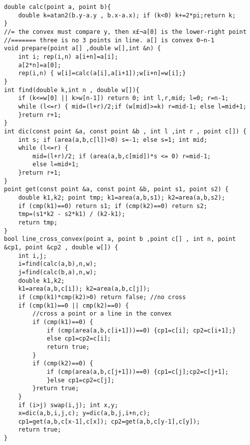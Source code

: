 \begin{lstlisting}
double calc(point a, point b){
	double k=atan2(b.y-a.y , b.x-a.x); if (k<0) k+=2*pi;return k;
}
//= the convex must compare y, then x£¬a[0] is the lower-right point
//======= three is no 3 points in line. a[] is convex 0~n-1
void prepare(point a[] ,double w[],int &n) {
	int i; rep(i,n) a[i+n]=a[i];
	a[2*n]=a[0];
	rep(i,n) { w[i]=calc(a[i],a[i+1]);w[i+n]=w[i];}
}
int find(double k,int n , double w[]){
	if (k<=w[0] || k>w[n-1]) return 0; int l,r,mid; l=0; r=n-1;
	while (l<=r) { mid=(l+r)/2;if (w[mid]>=k) r=mid-1; else l=mid+1;
	}return r+1;
}
int dic(const point &a, const point &b , int l ,int r , point c[]) {
	int s; if (area(a,b,c[l])<0) s=-1; else s=1; int mid;
	while (l<=r) {
		mid=(l+r)/2; if (area(a,b,c[mid])*s <= 0) r=mid-1;
		else l=mid+1;
	}return r+1;
}
point get(const point &a, const point &b, point s1, point s2) {
	double k1,k2; point tmp; k1=area(a,b,s1); k2=area(a,b,s2);
	if (cmp(k1)==0) return s1; if (cmp(k2)==0) return s2;
	tmp=(s1*k2 - s2*k1) / (k2-k1);
	return tmp;
}
bool line_cross_convex(point a, point b ,point c[] , int n, point &cp1, point &cp2 , double w[]) {
	int i,j;
	i=find(calc(a,b),n,w);
	j=find(calc(b,a),n,w);
	double k1,k2;
	k1=area(a,b,c[i]); k2=area(a,b,c[j]);
	if (cmp(k1)*cmp(k2)>0) return false; //no cross
	if (cmp(k1)==0 || cmp(k2)==0) {
		//cross a point or a line in the convex
		if (cmp(k1)==0) {
			if (cmp(area(a,b,c[i+1]))==0) {cp1=c[i]; cp2=c[i+1];}
			else cp1=cp2=c[i];
			return true;
		}
		if (cmp(k2)==0) {
			if (cmp(area(a,b,c[j+1]))==0) {cp1=c[j];cp2=c[j+1];
			}else cp1=cp2=c[j];
		}return true;
	}
	if (i>j) swap(i,j); int x,y;
	x=dic(a,b,i,j,c); y=dic(a,b,j,i+n,c);
	cp1=get(a,b,c[x-1],c[x]); cp2=get(a,b,c[y-1],c[y]);
	return true;
}
\end{lstlisting}
